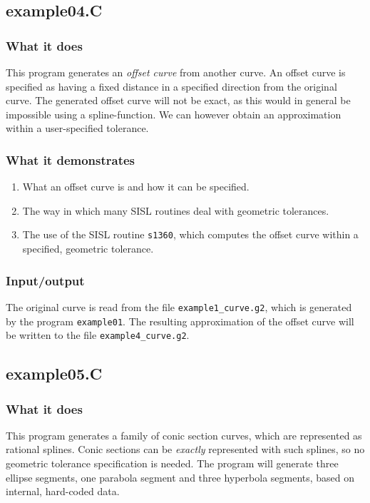 \subsection{example04.C}

\subsubsection{What it does}
This program generates an \emph{offset curve} from another curve.  An offset curve is
specified as having a fixed distance in a specified direction from the original curve.
The generated offset curve will not be exact, as this would in general be impossible using
a spline-function.  We can however obtain an approximation within a user-specified tolerance.

\subsubsection{What it demonstrates}
\begin{enumerate}
\item What an offset curve is and how it can be specified.
\item The way in which many SISL routines deal with geometric tolerances.
\item The use of the SISL routine \verb/s1360/, which computes the offset curve within a 
specified, geometric tolerance.
\end{enumerate}
\subsubsection{Input/output}
The original curve is read from the file \verb/example1_curve.g2/, which is generated by
the program \verb/example01/.  The resulting approximation of the offset curve will be 
written to the file \verb/example4_curve.g2/.

\subsection{example05.C}

\subsubsection{What it does}
This program generates a family of conic section curves, which are represented as rational
splines.  Conic sections can be \emph{exactly} represented with such splines, so no geometric 
tolerance specification is needed.  The program will generate three ellipse segments, one
parabola segment and three hyperbola segments, based on internal, hard-coded data.

